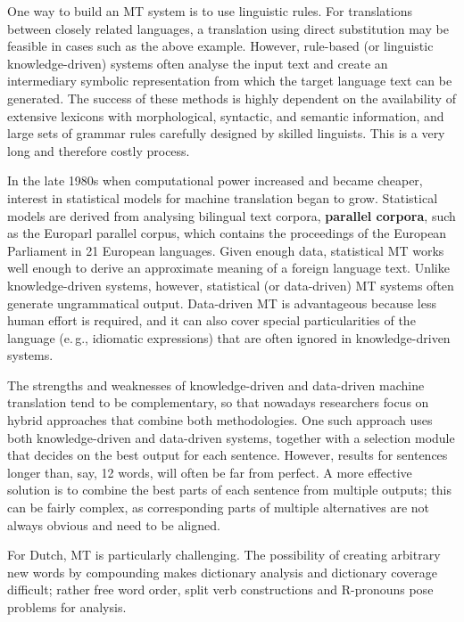 \begin{multicols}{2}
One way to build an MT system is to use linguistic rules. For translations between closely related languages, a translation using direct substitution may be feasible in cases such as the above example. However, rule-based (or linguistic knowledge-driven) systems often analyse the input text and create an intermediary symbolic representation from which the target language text can be generated. The success of these methods is highly dependent on the availability of extensive lexicons with morphological, syntactic, and semantic information, and large sets of grammar rules carefully designed by skilled linguists. This is a very long and therefore costly process.

In the late 1980s when computational power increased and became cheaper, interest in statistical models for machine translation began to grow. Statistical models are derived from analysing bilingual text corpora, \textbf{parallel corpora}, such as the Europarl parallel corpus, which contains the proceedings of the European Parliament in 21 European languages. Given enough data, statistical MT works well enough to derive an approximate meaning of a foreign language text. Unlike knowledge-driven systems, however, statistical (or data-driven) MT systems often generate ungrammatical output. Data-driven MT is advantageous because less human effort is required, and it can also cover special particularities of the language (e.\,g., idiomatic expressions) that are often ignored in knowledge-driven systems.

The strengths and weaknesses of knowledge-driven and data-driven machine translation tend to be complementary, so that nowadays researchers focus on hybrid approaches that combine both methodologies. One such approach uses both knowledge-driven and data-driven systems, together with a selection module that decides on the best output for each sentence. However, results for sentences longer than, say, 12 words, will often be far from perfect. A more effective solution is to combine the best parts of each sentence from multiple outputs; this can be fairly complex, as corresponding parts of multiple alternatives are not always obvious and need to be aligned.


 For Dutch, MT is particularly challenging. The possibility of creating arbitrary new words by compounding makes dictionary analysis and dictionary coverage difficult; rather free word order, split verb constructions and R-pronouns pose problems for analysis.


\end{multicols}
